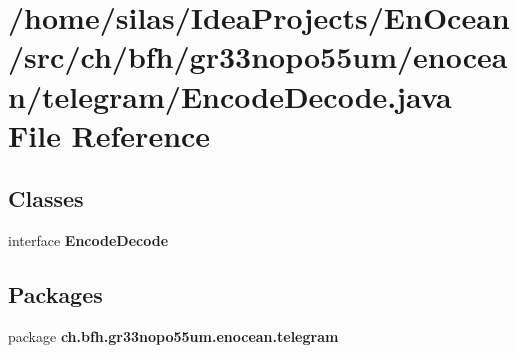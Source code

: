 \section{/home/silas/\+Idea\+Projects/\+En\+Ocean/src/ch/bfh/gr33nopo55um/enocean/telegram/\+Encode\+Decode.java File Reference}
\label{EncodeDecode_8java}
\subsection*{Classes}
\begin{DoxyCompactItemize}
\item 
interface {\bf Encode\+Decode}
\end{DoxyCompactItemize}
\subsection*{Packages}
\begin{DoxyCompactItemize}
\item 
package {\bf ch.\+bfh.\+gr33nopo55um.\+enocean.\+telegram}
\end{DoxyCompactItemize}
